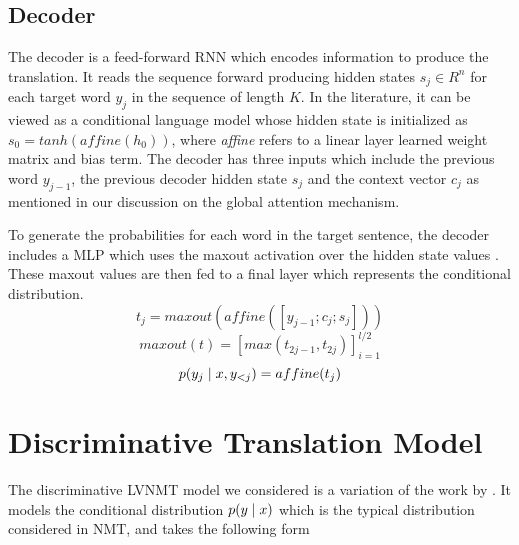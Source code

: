  




\subsection{Decoder}


The decoder is a feed-forward \ac{RNN} which encodes information to produce the translation. It reads the sequence forward producing hidden states $s_{j} \in R^{n}$ for each target word $y_{j}$ in the sequence of length $K$. In the literature, it can be viewed as a conditional language model \cite{koehn2017NMT} whose hidden state is initialized as $s_{0} = tanh(affine(h_{0}))$, where \textit{affine} refers to a linear layer learned weight matrix and bias term. The decoder has three inputs which include the previous word $y_{j-1}$, the previous decoder hidden state $s_{j}$ and the context vector $c_{j}$ as mentioned in our discussion on the global attention mechanism. 


To generate the probabilities for each word in the target sentence, the decoder includes a \ac{MLP} which uses the maxout activation over the hidden state values \cite{goodfellow2013maxout}. These maxout values are then fed to a final layer which represents the conditional distribution.  
\begin{equation}
	t_{j} = maxout(affine([y_{j-1}; c_{j}; s_{j} ]))
\end{equation}
\begin{equation}
	maxout(t) = [max(t_{2j -1}, t_{2j})]_{i=1}^{l / 2}
\end{equation}
\begin{equation}
p(y_{j} \; | \;{x, y_{<j}}) = affine(t_{j})
\end{equation}


\section{Discriminative Translation Model}


The discriminative \ac{LVNMT} model we considered is a variation of the work by \citet{Zhang2016VNMT}. It models the conditional distribution $p(y \; | \;{x})$ which is the typical distribution considered in \ac{NMT}, and takes the following form 

